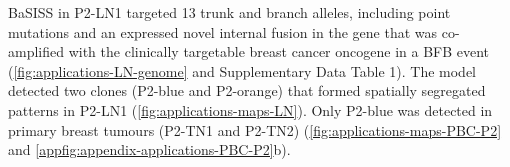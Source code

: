 
\ac{BaSISS} in P2-LN1 targeted 13 trunk and branch alleles, including point mutations and an expressed novel internal fusion in the  gene that was co-amplified with the clinically targetable breast cancer oncogene  in a \acf{BFB} event (\cref{fig:applications-LN-genome} and Supplementary Data Table 1). The model detected two clones (P2-blue and P2-orange) that formed spatially segregated patterns in P2-LN1 (\cref{fig:applications-maps-LN}). Only P2-blue was detected in primary breast tumours (P2-TN1 and P2-TN2) (\cref{fig:applications-maps-PBC-P2} and \cref{appfig:appendix-applications-PBC-P2}b).

